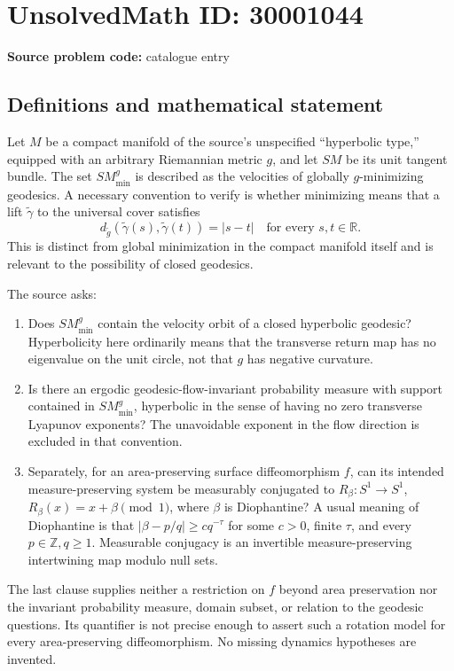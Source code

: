 \documentclass[11pt]{article}
\newcommand{\Z}{\mathbb{Z}}
\newcommand{\R}{\mathbb{R}}
\begin{document}
\section*{UnsolvedMath ID: 30001044}
\textbf{Source problem code:} catalogue entry
\subsection{Definitions and mathematical statement}
Let \(M\) be a compact manifold of the source's unspecified ``hyperbolic type,'' equipped with an arbitrary Riemannian metric \(g\), and let \(SM\) be its unit tangent bundle. The set \(SM_{\min}^g\) is described as the velocities of globally \(g\)-minimizing geodesics. A necessary convention to verify is whether minimizing means that a lift \(\widetilde\gamma\) to the universal cover satisfies
\[
d_{\widetilde g}(\widetilde\gamma(s),\widetilde\gamma(t))=|s-t|\quad\text{for every }s,t\in\R.
\]
This is distinct from global minimization in the compact manifold itself and is relevant to the possibility of closed geodesics.

The source asks:
\begin{enumerate}
\item Does \(SM_{\min}^g\) contain the velocity orbit of a closed hyperbolic geodesic? Hyperbolicity here ordinarily means that the transverse return map has no eigenvalue on the unit circle, not that \(g\) has negative curvature.
\item Is there an ergodic geodesic-flow-invariant probability measure with support contained in \(SM_{\min}^g\), hyperbolic in the sense of having no zero transverse Lyapunov exponents? The unavoidable exponent in the flow direction is excluded in that convention.
\item Separately, for an area-preserving surface diffeomorphism \(f\), can its intended measure-preserving system be measurably conjugated to \(R_\beta:S^1\to S^1\), \(R_\beta(x)=x+\beta\pmod1\), where \(\beta\) is Diophantine? A usual meaning of Diophantine is that \(|\beta-p/q|\geq c q^{-\tau}\) for some \(c>0\), finite \(\tau\), and every \(p\in\Z,q\geq1\). Measurable conjugacy is an invertible measure-preserving intertwining map modulo null sets.
\end{enumerate}
The last clause supplies neither a restriction on \(f\) beyond area preservation nor the invariant probability measure, domain subset, or relation to the geodesic questions. Its quantifier is not precise enough to assert such a rotation model for every area-preserving diffeomorphism. No missing dynamics hypotheses are invented.
\end{document}
